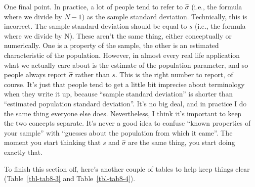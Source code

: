 \documentclass[
  a4paper,
]{book}
\begin{document}
One final point. In practice, a lot of people tend to refer to
\(\hat{\sigma}\) (i.e., the formula where we divide by \(N - 1\)) as the
sample standard deviation. Technically, this is incorrect. The sample
standard deviation should be equal to \(s\) (i.e., the formula where we
divide by N). These aren't the same thing, either conceptually or
numerically. One is a property of the sample, the other is an estimated
characteristic of the population. However, in almost every real life
application what we actually care about is the estimate of the
population parameter, and so people always report \(\hat{\sigma}\)
rather than \(s\). This is the right number to report, of course. It's
just that people tend to get a little bit imprecise about terminology
when they write it up, because ``sample standard deviation'' is shorter
than ``estimated population standard deviation''. It's no big deal, and
in practice I do the same thing everyone else does. Nevertheless, I
think it's important to keep the two concepts separate. It's never a
good idea to confuse ``known properties of your sample'' with ``guesses
about the population from which it came''. The moment you start thinking
that \(s\) and \(\hat{\sigma}\) are the same thing, you start doing
exactly that.

To finish this section off, here's another couple of tables to help keep
things clear (Table~\ref{tbl-tab8-3} and Table~\ref{tbl-tab8-4}).

\hypertarget{tbl-tab8-3}{}
 
  \providecommand{\huxb}[2]{\arrayrulecolor[RGB]{#1}\global\arrayrulewidth=#2pt}
  \providecommand{\huxvb}[2]{\color[RGB]{#1}\vrule width #2pt}
  \providecommand{\huxtpad}[1]{\rule{0pt}{#1}}
  \providecommand{\huxbpad}[1]{\rule[-#1]{0pt}{#1}}
\end{document}
